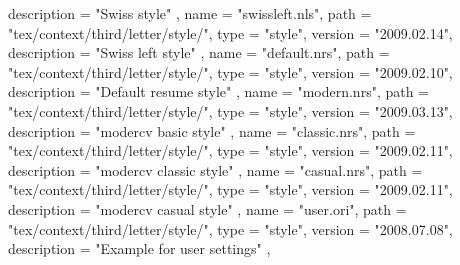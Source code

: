 {{        description = "Swiss style"
    } ,
    {
        name        = "swissleft.nls",
        path        = "tex/context/third/letter/style/",
        type        = "style",
        version     = "2009.02.14",
        description = "Swiss left style"
    } ,
    {
        name        = "default.nrs",
        path        = "tex/context/third/letter/style/",
        type        = "style",
        version     = "2009.02.10",
        description = "Default resume style"
    } ,
    {
        name        = "modern.nrs",
        path        = "tex/context/third/letter/style/",
        type        = "style",
        version     = "2009.03.13",
        description = "modercv basic style"
    } ,
    {
        name        = "classic.nrs",
        path        = "tex/context/third/letter/style/",
        type        = "style",
        version     = "2009.02.11",
        description = "modercv classic style"
    } ,
    {
        name        = "casual.nrs",
        path        = "tex/context/third/letter/style/",
        type        = "style",
        version     = "2009.02.11",
        description = "modercv casual style"
    } ,
    {
        name        = "user.ori",
        path        = "tex/context/third/letter/style/",
        type        = "style",
        version     = "2008.07.08",
        description = "Example for user settings"
    } ,
}

\stopluacode

\endLUATEX

\protect \endinput
